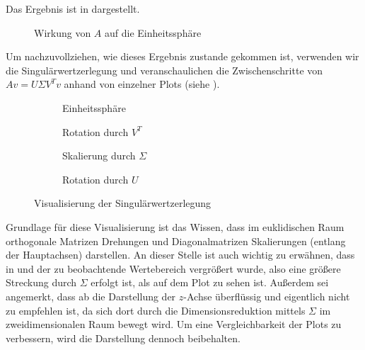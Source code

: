Das Ergebnis ist in  dargestellt.  
\begin{figure}[b]
    \centering
    \begin{subfigure}{0.45\textwidth}
        \centering
        
    \end{subfigure}
    \begin{subfigure}{0.45\textwidth}
        \centering
        
    \end{subfigure}
    \caption{Wirkung von \(A\) auf die Einheitssphäre}\label{fig:sph}
\end{figure}

Um nachzuvollziehen, wie dieses Ergebnis zustande gekommen ist, verwenden wir die Singulärwertzerlegung und veranschaulichen die Zwischenschritte von \(Av = U \Sigma V^{T}v\) anhand von einzelner Plots (siehe ). 
\begin{figure}[t]
    \centering
    \captionsetup[subfigure]{justification=centering}
    \begin{subfigure}{0.45\textwidth}
        \centering
        \caption{Einheitssphäre}\label{fig:svspha}
        
    \end{subfigure}
    \begin{subfigure}{0.45\textwidth}
        \centering
        \caption{Rotation durch \(V^{T}\)}\label{fig:svsphb}
        
    \end{subfigure}
    \begin{subfigure}{0.45\textwidth}
        \centering
        \caption{Skalierung durch \(\Sigma\)}\label{fig:svdsphc}
        
    \end{subfigure}
    \begin{subfigure}{0.45\textwidth}
        \centering
        \caption{Rotation durch \(U\)}\label{fig:svdsphd}
        
    \end{subfigure}
    \caption{Visualisierung der Singulärwertzerlegung}\label{fig:svdsph}
\end{figure}

Grundlage für diese Visualisierung ist das Wissen, dass im euklidischen Raum orthogonale Matrizen Drehungen und Diagonalmatrizen Skalierungen (entlang der Hauptachsen) darstellen.
An dieser Stelle ist auch wichtig zu erwähnen, dass in  und  der zu beobachtende Wertebereich vergrößert wurde, also eine größere Streckung durch \(\Sigma\) erfolgt ist, als auf dem Plot zu sehen ist.
Außerdem sei angemerkt, dass ab  die Darstellung der \(z\)-Achse überflüssig und eigentlich nicht zu empfehlen ist, da sich dort durch die Dimensionsreduktion mittels \(\Sigma\) im zweidimensionalen Raum bewegt wird.
Um eine Vergleichbarkeit der Plots zu verbessern, wird die Darstellung dennoch beibehalten.  

